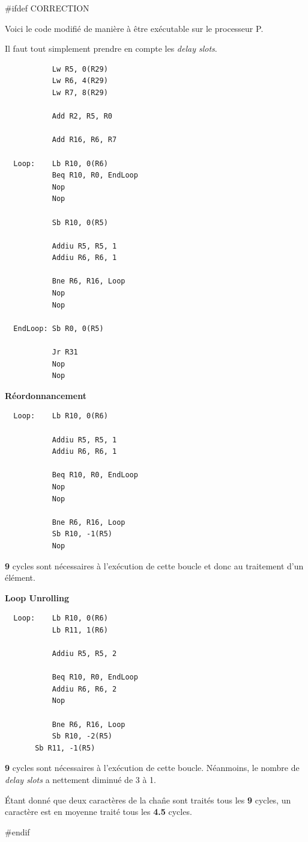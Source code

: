 #ifdef CORRECTION
\begin{correction}

  Voici le code modifi\'e de mani\`ere \`a \^etre ex\'ecutable sur le
  processeur P.

  Il faut tout simplement prendre en compte les \textit{delay slots}.

  \begin{verbatim}
           Lw R5, 0(R29)
           Lw R6, 4(R29)
           Lw R7, 8(R29)

           Add R2, R5, R0

           Add R16, R6, R7

  Loop:    Lb R10, 0(R6)
           Beq R10, R0, EndLoop
           Nop
           Nop

           Sb R10, 0(R5)

           Addiu R5, R5, 1
           Addiu R6, R6, 1

           Bne R6, R16, Loop
           Nop
           Nop

  EndLoop: Sb R0, 0(R5)

           Jr R31
           Nop
           Nop
  \end{verbatim}

  \textbf{R\'eordonnancement}

  \begin{verbatim}
  Loop:    Lb R10, 0(R6)

           Addiu R5, R5, 1
           Addiu R6, R6, 1

           Beq R10, R0, EndLoop
           Nop
           Nop

           Bne R6, R16, Loop
           Sb R10, -1(R5)
           Nop
  \end{verbatim}

  \textbf{9} cycles sont n\'ecessaires \`a l'ex\'ecution de cette boucle et
  donc au traitement d'un \'el\'ement.

  \textbf{Loop Unrolling}

  \begin{verbatim}
  Loop:    Lb R10, 0(R6)
           Lb R11, 1(R6)

           Addiu R5, R5, 2

           Beq R10, R0, EndLoop
           Addiu R6, R6, 2
           Nop

           Bne R6, R16, Loop
           Sb R10, -2(R5)
	   Sb R11, -1(R5)
  \end{verbatim}

  \textbf{9} cycles sont n\'ecessaires \`a l'ex\'ecution de cette boucle.
  N\'eanmoins, le nombre de \textit{delay slots} a nettement diminu\'e de
  3 \`a 1.

  \'Etant donn\'e que deux caract\`eres de la cha\^ne sont trait\'es tous
  les \textbf{9} cycles, un caract\`ere est en moyenne trait\'e tous les
  \textbf{4.5} cycles.

\end{correction}
#endif


